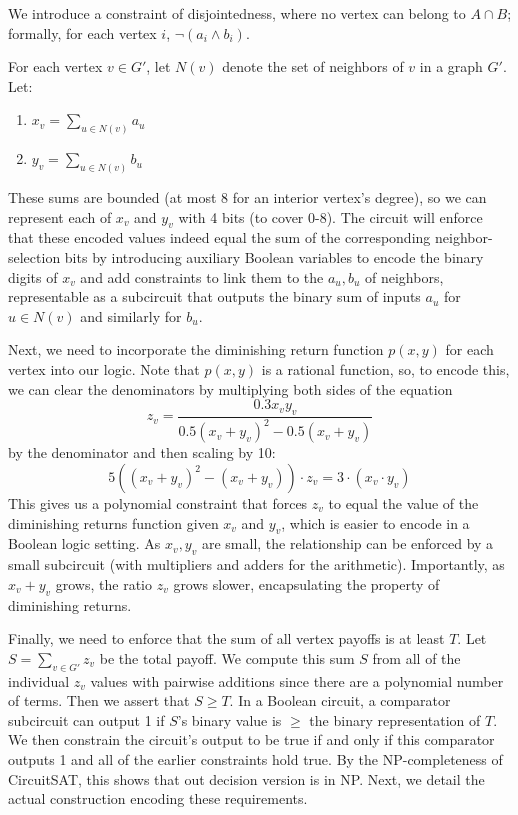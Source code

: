 \documentclass{article}
\begin{document}
We introduce a constraint of disjointedness, where no vertex can belong to $A \cap B$; formally, for each vertex $i$, $\neg (a_i \land b_i)$.

For each vertex $v \in G'$, let $N(v)$ denote the set of neighbors of $v$ in a graph $G'$. Let:
\begin{enumerate}
    \item $x_v = \sum_{u \in N(v)} a_u$
    \item $y_v = \sum_{u \in N(v)} b_u$
\end{enumerate}

These sums are bounded (at most 8 for an interior vertex's degree), so we can represent each of $x_v$ and $y_v$ with 4 bits (to cover 0-8). The circuit will enforce that these encoded values indeed equal the sum of the corresponding neighbor-selection bits by introducing auxiliary Boolean variables to encode the binary digits of $x_v$ and add constraints to link them to the $a_u, b_u$ of neighbors, representable as a subcircuit that outputs the binary sum of inputs $a_u$ for $u \in N(v)$ and similarly for $b_u$.

Next, we need to incorporate the diminishing return function $p(x,y)$ for each vertex into our logic. Note that $p(x,y)$ is a rational function, so, to encode this, we can clear the denominators by multiplying both sides of the equation
\[z_v= \frac{0.3x_v y_v}{0.5(x_v+y_v)^{2}-0.5(x_v+y_v)}\]
by the denominator and then scaling by 10:
\[5((x_v + y_v)^2 - (x_v + y_v)) \cdot z_v = 3 \cdot (x_v \cdot y_v)\]
This gives us a polynomial constraint that forces $z_v$ to equal the value of the diminishing returns function given $x_v$ and $y_v$, which is easier to encode in a Boolean logic setting. As $x_v, y_v$ are small, the relationship can be enforced by a small subcircuit (with multipliers and adders for the arithmetic). Importantly, as $x_v + y_v$ grows, the ratio $z_v$ grows slower, encapsulating the property of diminishing returns.

Finally, we need to enforce that the sum of all vertex payoffs is at least $T$. Let $S = \sum_{v \in G'} z_v$ be the total payoff. We compute this sum $S$ from all of the individual $z_v$ values with pairwise additions since there are a polynomial number of terms. Then we assert that $S \geq T$. In a Boolean circuit, a comparator subcircuit can output 1 if $S$'s binary value is $\geq$ the binary representation of $T$. We then constrain the circuit's output to be true if and only if this comparator outputs 1 and all of the earlier constraints hold true. By the NP-completeness of CircuitSAT, this shows that out decision version is in NP.
Next, we detail the actual construction encoding these requirements.
\end{document}

